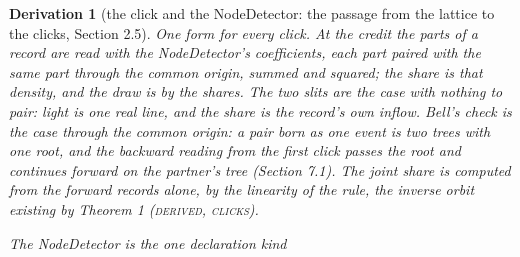 \documentclass[pdflatex,sn-mathphys-num]{sn-jnl}
\newcommand{\claimmark}[1]{\textup{\textsc{#1}}}
\newcommand{\fence}[1]{\textup{\textsc{#1}}}
\theoremstyle{thmstyleone}
\newtheorem{derivation}{Derivation}
\begin{document}
\begin{derivation}[the click and the NodeDetector: the passage from the lattice to the clicks, Section 2.5]
\emph{One form for every click.} At the credit the parts of a record are read with the NodeDetector's coefficients, each part paired with the same part through the common origin, summed and squared; the share is that density, and the draw is by the shares. The two slits are the case with nothing to pair: light is one real line, and the share is the record's own inflow. Bell's check is the case through the common origin: a pair born as one event is two trees with one root, and the backward reading from the first click passes the root and continues forward on the partner's tree (Section 7.1). The joint share is computed from the forward records alone, by the linearity of the rule, the inverse orbit existing by Theorem 1 (\claimmark{derived}, \fence{clicks}).

\emph{The NodeDetector is the one declaration kind}


\end{derivation}
\end{document}
